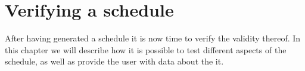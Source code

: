 \chapter{Verifying a schedule} \label{cha:cha2}
After having generated a schedule it is now time to verify the validity thereof. In this chapter we will describe how it is possible to test different aspects of the schedule, as well as provide the user with data about the it.



